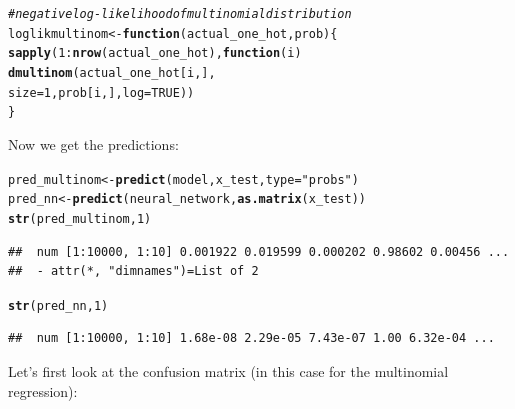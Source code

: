 \documentclass[a4paper]{article}
\makeatletter
\newcommand{\hlnum}[1]{\textcolor[rgb]{0.686,0.059,0.569}{#1}}%
\newcommand{\hlstr}[1]{\textcolor[rgb]{0.192,0.494,0.8}{#1}}%
\newcommand{\hlcom}[1]{\textcolor[rgb]{0.678,0.584,0.686}{\textit{#1}}}%
\newcommand{\hlopt}[1]{\textcolor[rgb]{0,0,0}{#1}}%
\newcommand{\hlstd}[1]{\textcolor[rgb]{0.345,0.345,0.345}{#1}}%
\newcommand{\hlkwa}[1]{\textcolor[rgb]{0.161,0.373,0.58}{\textbf{#1}}}%
\newcommand{\hlkwb}[1]{\textcolor[rgb]{0.69,0.353,0.396}{#1}}%
\newcommand{\hlkwc}[1]{\textcolor[rgb]{0.333,0.667,0.333}{#1}}%
\newcommand{\hlkwd}[1]{\textcolor[rgb]{0.737,0.353,0.396}{\textbf{#1}}}%
\newenvironment{kframe}{%
 \def\at@end@of@kframe{}%
 \ifinner\ifhmode%
  \def\at@end@of@kframe{\end{minipage}}%
  \begin{minipage}{\columnwidth}%
 \fi\fi%
 \def\FrameCommand##1{\hskip\@totalleftmargin \hskip-\fboxsep
 \colorbox{shadecolor}{##1}\hskip-\fboxsep
     \hskip-\linewidth \hskip-\@totalleftmargin \hskip\columnwidth}%
 \MakeFramed {\advance\hsize-\width
   \@totalleftmargin\z@ \linewidth\hsize
   \@setminipage}}%
 {\par\unskip\endMakeFramed%
 \at@end@of@kframe}
\newenvironment{knitrout}{}{} %
\makeatother
\begin{document}
{\begin{enumerate}
\begin{knitrout}
\begin{kframe}
\begin{alltt}
\hlcom{# negative log-likelihood of multinomial distribution}
\hlstd{loglikmultinom} \hlkwb{<-} \hlkwa{function}\hlstd{(}\hlkwc{actual_one_hot}\hlstd{,} \hlkwc{prob}\hlstd{) \{}
  \hlkwd{sapply}\hlstd{(}\hlnum{1}\hlopt{:}\hlkwd{nrow}\hlstd{(actual_one_hot),} \hlkwa{function}\hlstd{(}\hlkwc{i}\hlstd{)}
    \hlkwd{dmultinom}\hlstd{(actual_one_hot[i,],}
              \hlkwc{size} \hlstd{=} \hlnum{1}\hlstd{, prob[i,],} \hlkwc{log} \hlstd{=} \hlnum{TRUE}\hlstd{))}
\hlstd{\}}
\end{alltt}
\end{kframe}
\end{knitrout}

Now we get the predictions:

\begin{knitrout}
\color{fgcolor}\begin{kframe}
\begin{alltt}
\hlstd{pred_multinom} \hlkwb{<-} \hlkwd{predict}\hlstd{(model, x_test,} \hlkwc{type} \hlstd{=} \hlstr{"probs"}\hlstd{)}
\hlstd{pred_nn} \hlkwb{<-} \hlkwd{predict}\hlstd{(neural_network,} \hlkwd{as.matrix}\hlstd{(x_test))}
\hlkwd{str}\hlstd{(pred_multinom,} \hlnum{1}\hlstd{)}
\end{alltt}
\begin{verbatim}
##  num [1:10000, 1:10] 0.001922 0.019599 0.000202 0.98602 0.00456 ...
##  - attr(*, "dimnames")=List of 2
\end{verbatim}
\begin{alltt}
\hlkwd{str}\hlstd{(pred_nn,} \hlnum{1}\hlstd{)}
\end{alltt}
\begin{verbatim}
##  num [1:10000, 1:10] 1.68e-08 2.29e-05 7.43e-07 1.00 6.32e-04 ...
\end{verbatim}
\end{kframe}
\end{knitrout}

Let's first look at the confusion matrix (in this case for the multinomial regression):


\end{enumerate}}
\end{document}
